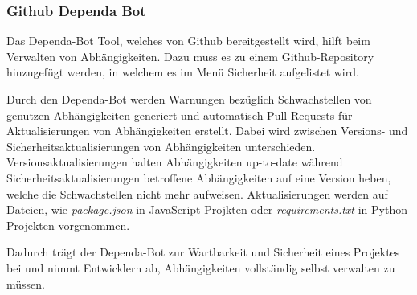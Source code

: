 \subsubsection{Github Dependa Bot} \label{sec:Dependa}
    Das Dependa-Bot Tool, welches von Github bereitgestellt wird, hilft beim Verwalten von Abhängig\-keiten.
    Dazu muss es zu einem Github-Repository hinzugefügt werden, in welchem es im Menü Sicherheit aufgelistet wird.

    Durch den Dependa-Bot werden Warnungen bezüglich Schwachstellen von genutzen Abhängigkeiten generiert und automatisch Pull-Requests für Aktualisierungen von Abhängigkeiten erstellt.
    Dabei wird zwischen Versions- und Sicherheitsaktualisierungen von Abhängigkeiten unterschieden.
    Versionsaktualisierungen halten Abhängigkeiten up-to-date während Sicherheitsaktualisierungen betroffene Abhängigkeiten auf eine Version heben, welche die Schwachstellen nicht mehr aufweisen.
    Aktualisierungen werden auf Dateien, wie \textit{package.json} in JavaScript-Projkten oder \textit{requirements.txt} in Python-Projekten vorgenommen.

    Dadurch trägt der Dependa-Bot zur Wartbarkeit und Sicherheit eines Projektes bei und nimmt Entwicklern ab, Abhängigkeiten vollständig selbst verwalten zu müssen.